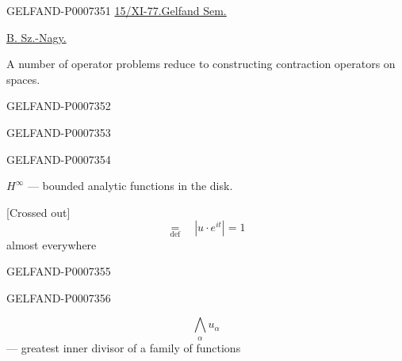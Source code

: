 \begin{GelfandAdjacentEvidence}{GELFAND-P000735}{1}
\noindent\underline{15/XI-77.}\hspace{2em}\underline{Gelfand Sem.}

\underline{B. Sz.-Nagy.}

A number of operator problems reduce to constructing contraction operators on  spaces.
\end{GelfandAdjacentEvidence}
\begin{GelfandAdjacentEvidence}{GELFAND-P000735}{2}

\end{GelfandAdjacentEvidence}
\begin{GelfandAdjacentEvidence}{GELFAND-P000735}{3}

\end{GelfandAdjacentEvidence}
\begin{GelfandAdjacentEvidence}{GELFAND-P000735}{4}


\(H^\infty\) --- bounded analytic functions in the disk.

[Crossed out] 
\[
\underset{\mathrm{def}}{=}\quad |u\cdot e^{it}|=1
\]
\hspace*{2em} almost everywhere
\end{GelfandAdjacentEvidence}
\begin{GelfandAdjacentEvidence}{GELFAND-P000735}{5}

\end{GelfandAdjacentEvidence}
\begin{GelfandAdjacentEvidence}{GELFAND-P000735}{6}


\[
\bigwedge_\alpha u_\alpha
\]
--- greatest inner divisor of a family of functions

\end{GelfandAdjacentEvidence}
